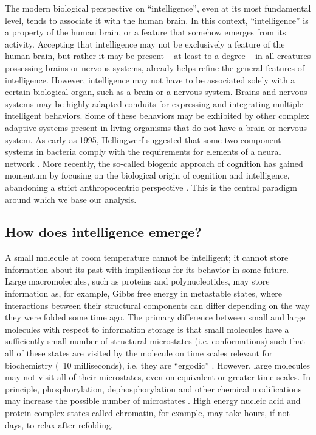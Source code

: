 The modern biological perspective on ``intelligence'', even at its most fundamental level, tends to associate it with the human brain. In this context, ``intelligence'' is a property of the human brain, or a feature that somehow emerges from its activity. Accepting that intelligence may not be exclusively a feature of the human brain, but rather it may be present – at least to a degree – in all creatures possessing brains or nervous systems, already helps refine the general features of intelligence. However, intelligence may not have to be associated solely with a certain biological organ, such as a brain or a nervous system. Brains and nervous systems may be highly adapted conduits for expressing and integrating multiple intelligent behaviors. Some of these behaviors may be exhibited by other complex adaptive systems present in living organisms that do not have a brain or nervous system. As early as 1995, Hellingwerf suggested that some two-component systems in bacteria comply with the requirements for elements of a neural network \cite{hellingwerf_signal_1995}. More recently, the so-called biogenic approach of cognition has gained momentum by focusing on the biological origin of cognition and intelligence, abandoning a strict anthropocentric perspective \cite{lengeler_metabolic_2000,lyon_biogenic_2006}. This is the central paradigm around which we base our analysis.

\subsection{How does intelligence emerge?}

A small molecule at room temperature cannot be intelligent; it cannot store information about its past with implications for its behavior in some future. Large macromolecules, such as proteins and polynucleotides, may store information as, for example, Gibbs free energy in metastable states, where interactions between their structural components can differ depending on the way they were folded some time ago. The primary difference between small and large molecules with respect to information storage is that small molecules have a sufficiently small number of structural microstates (i.e. conformations) such that all of these states are visited by the molecule on time scales relevant for biochemistry (~10 milliseconds), i.e. they are “ergodic” \cite{westerhoff_thermodynamics_1987}. However, large molecules may not visit all of their microstates, even on equivalent or greater time scales. In principle, phosphorylation, dephosphorylation and other chemical modifications may increase the possible number of microstates \cite{kamp_molecular_1986}. High energy nucleic acid and protein complex states called chromatin, for example, may take hours, if not days, to relax after refolding.

